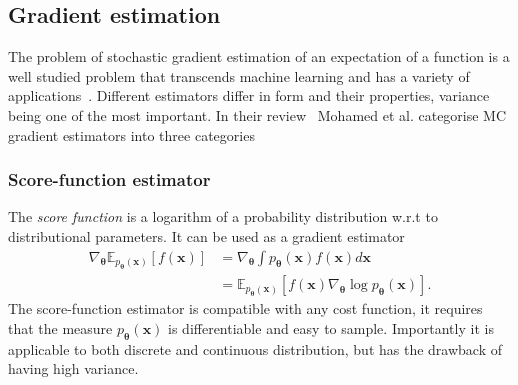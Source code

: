 \subsection{Gradient estimation}
\label{subsec:gbopt-gest}
The problem of stochastic gradient estimation of an expectation of a function is a well studied problem that transcends machine learning and has a variety of applications~\cite{chriss1997black, schrittwieser2020mastering}. Different estimators differ in form and their properties, variance being one of the most important. In their review~\cite{mohamed2020monte} Mohamed et al. categorise MC gradient estimators into three categories

\subsubsection{Score-function estimator}
The \emph{score function} is a logarithm of a probability distribution w.r.t to distributional parameters. It can be used as a gradient estimator
\begin{equation}
\begin{aligned}
\nabla_{\boldsymbol{\theta}} \mathbb{E}_{p_{\boldsymbol{\theta}}(\mathbf{x})}[f(\mathbf{x})] &=  \nabla_{\boldsymbol{\theta}} \int p_{\boldsymbol{\theta}}(\mathbf{x}) f(\mathbf{x}) d \mathbf{x} \\
&= \mathbb{E}_{p_{\boldsymbol{\theta}}(\mathbf{x})}\left[f(\mathbf{x}) \nabla_{\boldsymbol{\theta}} \log p_{\boldsymbol{\theta}}(\mathbf{x})\right].
\end{aligned}
\end{equation}
The score-function estimator is compatible with any cost function, it requires that the measure $p_{\boldsymbol{\theta}}(\mathbf{x})$ is differentiable and easy to sample. Importantly it is applicable to both discrete and continuous distribution, but has the drawback of having high variance.

